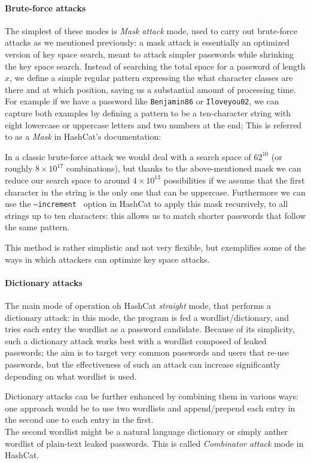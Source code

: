 \paragraph{Brute-force attacks}\label{par:brute-force}
The simplest of these modes is \emph{Mask attack} mode, used to carry out brute-force attacks as we mentioned previously: a mask attack is essentially an optimized version of key space search, meant to attack simpler passwords while shrinking the key space search. 
Instead of searching the total space for a password of length $x$, we define a simple regular pattern expressing the what character classes are there and at which position, saving us a substantial amount of processing time.
For example if we have a password like \texttt{Benjamin86} or \texttt{Iloveyou02}, we can capture both examples by defining a pattern to be a ten-character string with eight lowercase or uppercase letters and two numbers at the end; This is referred to as a \emph{Mask} in HashCat's documentation:

In a classic brute-force attack we would deal with a search space of $62^{10}$ (or roughly $8 \times 10^{17}$ combinations), but thanks to the above-mentioned mask we can reduce our search space to around $4 \times 10^{13}$ possibilities if we assume that the first character in the string is the only one that can be uppercase.
Furthermore we can use the \texttt{--increment } option in HashCat to apply this mask recursively, to all strings up to ten characters: this allows us to match shorter passwords that follow the same pattern.

This method is rather simplistic and not very flexible, but exemplifies some of the ways in which attackers can optimize key space attacks.

\paragraph{Dictionary attacks}
The main mode of operation oh HashCat \emph{straight} mode, that performs a dictionary attack: in this mode, the program is fed a wordlist/dictionary, and tries each entry the wordlist as a password candidate. Because of its simplicity, such a dictionary attack works best with a wordlist composed of leaked passwords; the aim is to target very common passwords and users that re-use passwords, but the effectiveness of such an attack can increase significantly depending on what wordlist is used.

Dictionary attacks can be further enhanced by combining them in various ways: one approach would be to use two wordlists and append/prepend each entry in the second one to each entry in the first.\\ 
The second wordlist might be a natural language dictionary or simply anther wordlist of plain-text leaked passwords. This is called \emph{Combinator attack} mode in HashCat. 

